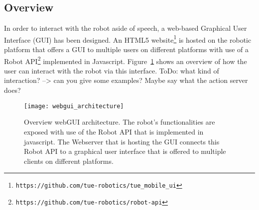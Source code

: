 \subsection*{Overview}

In order to interact with the robot aside of speech, a web-based Graphical User Interface (GUI) has been designed. An HTML5 website\footnote{\texttt{https://github.com/tue-robotics/tue\_mobile\_ui}} is hosted on the robotic platform that offers a GUI to multiple users on different platforms with use of a Robot API\footnote{\texttt{https://github.com/tue-robotics/robot-api}} implemented in Javascript. Figure~\ref{fig:webgui_architecture} shows an overview of how the user can interact with the robot via this interface. ToDo: what kind of interaction? --> can you give some examples? Maybe say what the action server does?

\begin{figure}[ht]
        \texttt{[image: webgui\_architecture]}
        \caption{Overview webGUI architecture. The robot's functionalities are exposed with use of the Robot API that is implemented in javascript. The Webserver that is hosting the GUI connects this Robot API to a graphical user interface that is offered to multiple clients on different platforms.}
        \label{fig:webgui_architecture}
\end{figure}


